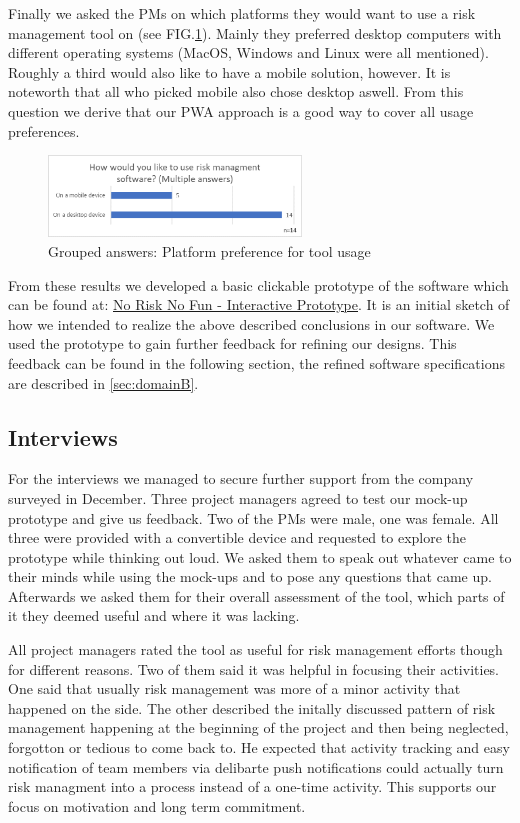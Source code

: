 Finally we asked the PMs on which platforms they would want to use a risk management tool on (see FIG.\ref{fig:label26}). Mainly they preferred desktop computers with different operating systems (MacOS, Windows and Linux were all mentioned). Roughly a third would also like to have a mobile solution, however. It is noteworth that all who picked mobile also chose desktop aswell. From this question we derive that our PWA approach is a good way to cover all usage preferences.

\begin{figure}[H]
	\centering
	\includegraphics[width=0.6\textwidth]{Assets/survey_results/Q7.png}
	\caption{Grouped answers: Platform preference for tool usage}
	\label{fig:label26}
\end{figure}

From these results we developed a basic clickable prototype of the software which can be found at: \underline{\href{https://norisknofun.invisionapp.com/prototype/NoRiskNoFunPreview-ck5aubx9g002w6o01rhyo61z3/play/40faaf12}{No Risk No Fun - Interactive Prototype}}. It is an initial sketch of how we intended to realize the above described conclusions in our software. We used the prototype to gain further feedback for refining our designs. This feedback can be found in the following section, the refined software specifications are described in \ref{sec:domainB}.

\subsection{Interviews}
\label{sec:DomainAb}
For the interviews we managed to secure further support from the company surveyed in December. Three project managers agreed to test our mock-up prototype and give us feedback. Two of the PMs were male, one was female. All three were provided with a convertible device and requested to explore the prototype while thinking out loud. We asked them to speak out whatever came to their minds while using the mock-ups and to pose any questions that came up. Afterwards we asked them for their overall assessment of the tool, which parts of it they deemed useful and where it was lacking.

All project managers rated the tool as useful for risk management efforts though for different reasons. Two of them said it was helpful in focusing their activities. One said that usually risk management was more of a minor activity that happened on the side. The other described the initally discussed pattern of risk management happening at the beginning of the project and then being neglected, forgotton or tedious to come back to. He expected that activity tracking and easy notification of team members via delibarte push notifications could actually turn risk managment into a process instead of a one-time activity. This supports our focus on motivation and long term commitment.


